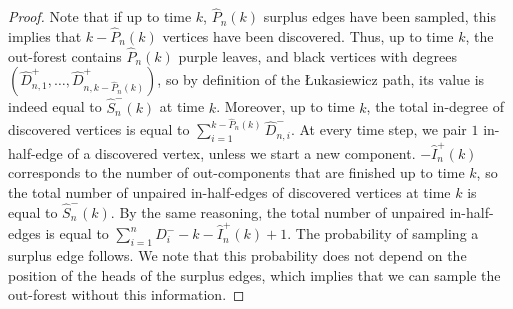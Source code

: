 \begin{proof}
Note that if up to time $k$, $\hat{P}_n(k)$ surplus edges have been sampled, this implies that $k-\hat{P}_n(k)$ vertices have been discovered. Thus, up to time $k$, the out-forest contains $\hat{P}_n(k)$ purple leaves, and black vertices with degrees $(\hat{D}^+_{n,1},\dots,\hat{D}^+_{n,k-\hat{P}_n(k)})$, so by definition of the \L ukasiewicz path, its value is indeed equal to $\hat{S}^-_n(k)$ at time $k$. Moreover, up to time $k$, the total in-degree of discovered vertices is equal to $\sum_{i=1}^{k-\hat{P}_n(k)}\hat{D}^-_{n,i}$. At every time step, we pair $1$ in-half-edge of a discovered vertex, unless we start a new component. $-\hat{I}^+_n(k)$ corresponds to the number of out-components that are finished up to time $k$, so the total number of unpaired in-half-edges of discovered vertices at time $k$ is equal to $\hat{S}^-_n(k)$. By the same reasoning, the total number of unpaired in-half-edges is equal to $\sum_{i=1}^n D^-_i-k-\hat{I}^+_n(k)+1$. The probability of sampling a surplus edge follows. We note that this probability does not depend on the position of the heads of the surplus edges, which implies that we can sample the out-forest without this information.
\end{proof}

